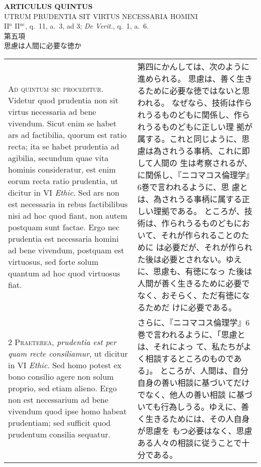 \documentclass[10pt]{jsarticle} %
\begin{document}
\begin{center}
 {\Large {\bf ARTICULUS QUINTUS}}\\
 {\large UTRUM PRUDENTIA SIT VIRTUS NECESSARIA HOMINI}\\
 {\footnotesize II$^a$ II$^{ae}$, q.~11, a.~3, ad 3; {\itshape De
 Verit.}, q.~1, a.~6.}\\
 {\Large 第五項\\思慮は人間に必要な徳か}
\end{center}

\begin{longtable}{p{21em}p{21em}}


{\huge A}{\scshape d quintum sic proceditur}. Videtur quod prudentia
 non sit virtus necessaria ad bene vivendum. Sicut enim se habet ars ad
 factibilia, quorum est ratio recta; ita se habet prudentia ad agibilia,
 secundum quae vita hominis consideratur, est enim eorum recta ratio
 prudentia, ut dicitur in VI {\itshape Ethic}. Sed ars non est
 necessaria in rebus factibilibus nisi ad hoc quod fiant, non autem
 postquam sunt factae. Ergo nec prudentia est necessaria homini ad bene
 vivendum, postquam est virtuosus, sed forte solum quantum ad hoc quod
 virtuosus fiat.

&

第四にかんしては、次のように進められる。
思慮は、善く生きるために必要な徳ではないと思われる。
なぜなら、技術は作られうるものどもに関係し、作られうるものどもに正しい理
 拠が属する。これと同じように、思慮は為されうる事柄、これに即して人間の
 生は考察されるが、に関係し、『ニコマコス倫理学』6巻で言われるように、思
 慮とは、為されうる事柄に属する正しい理拠である。
ところが、技術は、作られうるものどもにおいて、それが作られることのために
 は必要だが、それが作られた後は必要とされない。ゆえに、思慮も、有徳になっ
 た後は人間が善く生きるために必要でなく、おそらく、ただ有徳になるためだ
 けに必要である。



\\



{\scshape 2 Praeterea}, {\itshape prudentia est per quam recte
 consiliamur}, ut dicitur in VI {\itshape Ethic}. Sed homo potest ex
 bono consilio agere non solum proprio, sed etiam alieno. Ergo non est
 necessarium ad bene vivendum quod ipse homo habeat prudentiam; sed
 sufficit quod prudentum consilia sequatur.

&

さらに、『ニコマコス倫理学』6巻で言われるように、「思慮とは、それによっ
 て、私たちがよく相談するところのものである」。
ところが、人間は、自分自身の善い相談に基づいてだけでなく、他人の善い相談
 に基づいても行為しうる。ゆえに、善く生きるためには、その人自身が思慮を
 もつ必要はなく、思慮ある人々の相談に従うことで十分である。


\end{longtable}
\end{document}
